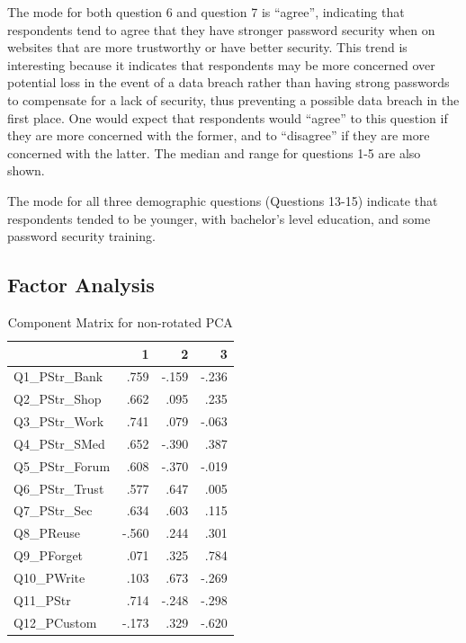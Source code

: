 \documentclass[letterpaper, 10 pt, conference]{ieeeconf}  %
\begin{document}
The mode for both question 6 and question 7 is “agree”, indicating that respondents tend to agree that they have stronger password security when on websites that are more trustworthy or have better security. This trend is interesting because it indicates that respondents may be more concerned over potential loss in the event of a data breach rather than having strong passwords to compensate for a lack of security, thus preventing a possible data breach in the first place. One would expect that respondents would “agree” to this question if they are more concerned with the former, and to “disagree” if they are more concerned with the latter. The median and range for questions 1-5 are also shown.

The mode for all three demographic questions (Questions 13-15) indicate that respondents tended to be younger, with bachelor’s level education, and some password security training.

\subsection{Factor Analysis}

\begin{table}[h]
\caption{Component Matrix for non-rotated PCA}
\label{tab:compmatrix}
\begin{center}
\begin{tabular}{lrrr}
\hline
                & 1     & 2     & 3     \\ \hline
Q1\_PStr\_Bank  & .759  & -.159 & -.236 \\ \hline
Q2\_PStr\_Shop  & .662  & .095  & .235  \\ \hline
Q3\_PStr\_Work  & .741  & .079  & -.063 \\ \hline
Q4\_PStr\_SMed  & .652  & -.390 & .387  \\ \hline
Q5\_PStr\_Forum & .608  & -.370 & -.019 \\ \hline
Q6\_PStr\_Trust & .577  & .647  & .005  \\ \hline
Q7\_PStr\_Sec   & .634  & .603  & .115  \\ \hline
Q8\_PReuse      & -.560 & .244  & .301  \\ \hline
Q9\_PForget     & .071  & .325  & .784  \\ \hline
Q10\_PWrite     & .103  & .673  & -.269 \\ \hline
Q11\_PStr       & .714  & -.248 & -.298 \\ \hline
Q12\_PCustom    & -.173 & .329  & -.620 \\ \hline
\end{tabular}
\end{center}
\end{table}
\end{document}

